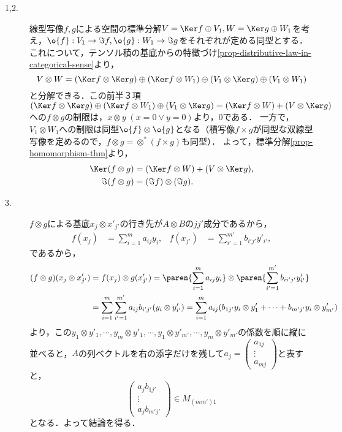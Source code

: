 \documentclass[uplatex, dvipdfmx]{jsreport}
\begin{document}
\begin{Proof}\mbox{}
    \begin{description}
        \item[1,2.] 
        線型写像$f,g$による空間の標準分解$V=\Ker f\oplus V_1,W=\Ker g\oplus W_1$を考え，$\o{f}:V_1\to\Im f,\o{g}:W_1\to\Im g$をそれぞれが定める同型とする．
        これについて，テンソル積の基底からの特徴づけ\ref{prop-distributive-law-in-categorical-sense}より，
        \[V\otimes W=(\Ker f\otimes\Ker g)\oplus(\Ker f\otimes W_1)\oplus(V_1\otimes\Ker g)\oplus(V_1\otimes W_1)\]
        と分解できる．この前半３項$(\Ker f\otimes\Ker g)\oplus(\Ker f\otimes W_1)\oplus(V_1\otimes\Ker g)=(\Ker f\otimes W)+(V\otimes\Ker g)$への$f\otimes g$の制限は，$x\otimes y\;(x=0\lor y=0)$より，$0$である．
        一方で，$V_1\otimes W_1$への制限は同型$\o{f}\otimes\o{g}$となる（積写像$f\times g$が同型な双線型写像を定めるので，$f\otimes g=\otimes^*(f\times g)$も同型）．
        よって，標準分解\ref{prop-homomorphism-thm}より，
        \begin{align*}
            \Ker(f\otimes g)&=(\Ker f\otimes W)+(V\otimes\Ker g),\\
            \Im (f\otimes g)&=(\Im f)\otimes(\Im g).
        \end{align*}
        \item[3.]
        $f\otimes g$による基底$x_j\otimes x'_{j'}$の行き先が$A\otimes B$の$jj'$成分であるから，
        \begin{align*}
            f(x_j)&=\sum^m_{i=1}a_{ij}y_i,&f(x_{j'})&=\sum^{m'}_{i'=1}b_{i'j'}y'_{i'},
        \end{align*}
        であるから，
        \begin{align*}
            (f\otimes g)(x_j\otimes x'_{j'})&=f(x_j)\otimes g(x'_{j'})=\paren{\sum^m_{i=1}a_{ij}y_i}\otimes\paren{\sum^{m'}_{i'=1}b_{ii'j'}y'_{i'}}\\
            &=\sum^m_{i=1}\sum^{m'}_{i'=1}a_{ij}b_{i'j'}(y_i\otimes y'_{i'})=\sum^{m}_{i=1}a_{ij}(b_{1j'}y_i\otimes y'_1+\cdots+b_{m'j'}y_i\otimes y'_{m'})
        \end{align*}
        より，この$y_1\otimes y'_1,\cdots,y_m\otimes y'_1,\cdots,y_1\otimes y'_{m'},\cdots,y_m\otimes y'_{m'}$の係数を順に縦に並べると，$A$の列ベクトルを右の添字だけを残して$a_j=\begin{pmatrix}a_{1j}\\\vdots\\a_{mj}\end{pmatrix}$と表すと，
        \[\begin{pmatrix}a_jb_{1j'}\\\vdots\\a_jb_{m'j'}\end{pmatrix}\in M_{(mm')1}\]
        となる．よって結論を得る．
    \end{description}
\end{Proof}
\end{document}
